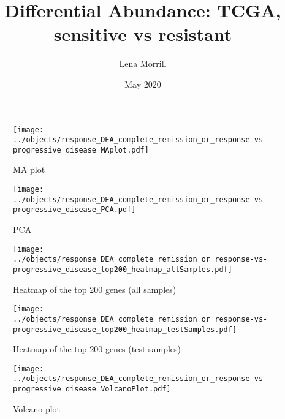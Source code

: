 \documentclass{article}
\title{Differential Abundance: TCGA, sensitive vs resistant}
\author{Lena Morrill}
\date{May 2020}
\begin{document}
\maketitle

\begin{figure}[h]
\texttt{[image: ../objects/response\_DEA\_complete\_remission\_or\_response-vs-progressive\_disease\_MAplot.pdf]}
\caption{MA plot}
\end{figure}

\begin{figure}[h]
\texttt{[image: ../objects/response\_DEA\_complete\_remission\_or\_response-vs-progressive\_disease\_PCA.pdf]}
\caption{PCA}
\end{figure}

\begin{figure}[h]
\texttt{[image: ../objects/response\_DEA\_complete\_remission\_or\_response-vs-progressive\_disease\_top200\_heatmap\_allSamples.pdf]}
\caption{Heatmap of the top 200 genes (all samples)}
\end{figure}
\begin{figure}[h]
\texttt{[image: ../objects/response\_DEA\_complete\_remission\_or\_response-vs-progressive\_disease\_top200\_heatmap\_testSamples.pdf]}
\caption{Heatmap of the top 200 genes (test samples)}
\end{figure}

\begin{figure}[h]
\texttt{[image: ../objects/response\_DEA\_complete\_remission\_or\_response-vs-progressive\_disease\_VolcanoPlot.pdf]}
\caption{Volcano plot}
\end{figure}
\end{document}
